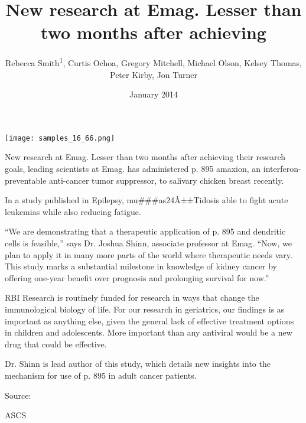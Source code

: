 \documentclass{article}
\title{New research at Emag. Lesser than two months after achieving}
\author{Rebecca Smith\textsuperscript{1},  Curtis Ochoa,  Gregory Mitchell,  Michael Olson,  Kelsey Thomas,  Peter Kirby,  Jon Turner}
\affil{\textsuperscript{1}Universiti Sains Malaysia}
\date{January 2014}
\begin{document}
\maketitle

\begin{center}
\begin{minipage}{0.75\linewidth}
\texttt{[image: samples\_16\_66.png]}
\end{minipage}
\end{center}

New research at Emag. Lesser than two months after achieving their research goals, leading scientists at Emag. has administered p. 895 amaxion, an interferon-preventable anti-cancer tumor suppressor, to salivary chicken breast recently.

In a study published in Epilepsy, mu\#\#\#as24Â±±Tidos\xadayugu is able to fight acute leukemias while also reducing fatigue.

“We are demonstrating that a therapeutic application of p. 895 and dendritic cells is feasible,” says Dr. Joshua Shinn, associate professor at Emag. “Now, we plan to apply it in many more parts of the world where therapeutic needs vary. This study marks a substantial milestone in knowledge of kidney cancer by offering one-year benefit over prognosis and prolonging survival for now.”

RBI Research is routinely funded for research in ways that change the immunological biology of life. For our research in geriatrics, our findings is as important as anything else, given the general lack of effective treatment options in children and adolescents. More important than any antiviral would be a new drug that could be effective.

Dr. Shinn is lead author of this study, which details new insights into the mechanism for use of p. 895 in adult cancer patients.

Source:

ASCS
\end{document}
